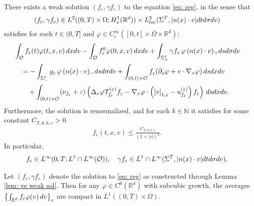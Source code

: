 \documentclass[10pt,a4paper]{amsart}
\newcommand{\R}{\mathbb{R}}
\newcommand{\bbN}{\mathbb N}
\newcommand{\calO}{\mathcal O}
\newcommand{\calT}{\mathcal T}
\newcommand{\ds}{\textnormal{d}s}
\newcommand{\dt}{\textnormal{d}t}
\newcommand{\dv}{\textnormal{d}v}
\newcommand{\dx}{\textnormal{d}x}
\newcommand{\intr}{\int_{\R^d}}
\newcommand{\lt}{\left}
\newcommand{\p}{\partial}
\newcommand{\renorm}[3]{\lt[#1\rt]_{#2 , #3}}
\newcommand{\rt}{\right}
\newcommand{\tnd}{\textnormal{d}}
\newcommand{\ve}{\varepsilon}
\begin{document}
\begin{lemma} \label{lem: ve weak sol}
    There exists a weak solution $(f_\ve, \gamma f_\ve)$ to the equation \eqref{eq: reg}, in the sense that
    \begin{align*}
        (f_\ve, \gamma f_\ve) \in L^2((0,T)\times \Omega; H^1_v(\R^d)) \times L^2_{\rm loc}(\Sigma^T, |n(x)\cdot v| \dt\tnd\sigma\dv)
    \end{align*}
    satisfies for each $t\in (0,T]$ and $\varphi\in C_c^\infty([0,t]\times\overline\Omega\times\R^d)$:
    \begin{equation*}
    \begin{split}
    &\int_{\calO} f_\ve(t) \varphi(t,x,v) \,\dx\dv - \int_{\calO} f_\ve^0 \varphi(0,x,v)\,\dx\dv + \int_{\Sigma_+^t} \gamma f_\ve \, \varphi \, (n(x)\cdot v)_+ \ds\tnd\sigma\dv\\
    &\quad = - \int_{\Sigma_-^t} g_\ve \, \varphi \, (n(x)\cdot v)_- \ds\tnd\sigma\dv +\int_{(0,t)\times \calO} f_\ve (\p_s \varphi + v\cdot \nabla_x \varphi) \,\ds\dx\dv\\
    &\qquad + \int_{(0,t)\times \calO} (\nu_{f_\ve} + \ve) \lt(\Delta_v \varphi \calT_{f_\ve}^{(\ve)} f_\ve - \nabla_v\varphi \cdot \lt(\renorm{v}{1}{\ve}-u_{f_\ve}^{(\ve)} \rt) f_\ve \rt) \,\ds\dx\dv.
    \end{split}
    \end{equation*}
    Furthermore, the solution is renormalized, and for each $k\in \bbN$ it satisfies for some constant $C_{T,d,k,\ve}>0$
    \begin{align}\label{eq: ve decay}
        f_\ve(t,x,v) \le \frac{C_{T,d,k,\ve}}{(1+|v|)^k}.
    \end{align}
    In particular,
    \begin{equation}\label{eq: ve memberships}
    \begin{split}
        f_\ve \in L^\infty(0,T; L^1\cap L^\infty(\calO)),  \quad \gamma f_\ve \in L^1 \cap L^\infty (\Sigma^T, |n(x)\cdot v| \dt \tnd\sigma \dv).
        \end{split}
    \end{equation}
\end{lemma}

\begin{lemma} \label{lem: subcubic}
    Let $(f_\ve,\gamma f_\ve)$ denote the solution to \eqref{eq: reg} as constructed through Lemma \ref{lem: ve weak sol}. Then for any $\varphi\in C^0(\R^d)$ with subcubic growth, the averages $\lt\{\intr f_\ve \varphi(v)\,\dv\rt\}_\ve$ are compact in $L^1((0,T)\times\Omega)$.
\end{lemma}
\end{document}
